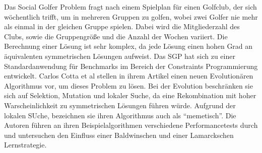 Das Social Golfer Problem fragt nach einem Spielplan für einen Golfclub, der sich wöchentlich trifft, um in mehreren Gruppen zu golfen, wobei zwei Golfer nie mehr als einmal in der gleichen Gruppe spielen. Dabei wird die Mitgliederzahl des Clubs, sowie die Gruppengröße und die Anzahl der Wochen variiert. Die Berechnung einer Lösung ist sehr komplex, da jede Lösung einen hohen Grad an äquivalenten symmetrischen Lösungen aufweist. Das SGP hat sich zu einer Standardanwendung für Benchmarks im Bereich der Constraints Programmierung entwickelt. Carlos Cotta et al stellen in ihrem Artikel einen neuen Evolutionären Algorithmus vor, um dieses Problem zu lösen. 
Bei der Evolution beschränken sie sich auf Selektion, Mutation und lokaler Suche, da eine Rekombination mit hoher Warscheinlichkeit zu symmetrischen Lösungen führen würde. Aufgrund der lokalen SUche, bezeichnen sie ihren Algorithmus auch als \enquote{memetisch}. Die Autoren führen an ihren Beispielalgorithmen verschiedene Performancetests durch und untersuchen den Einfluss einer Baldwinschen und einer Lamarckschen Lernstrategie.
